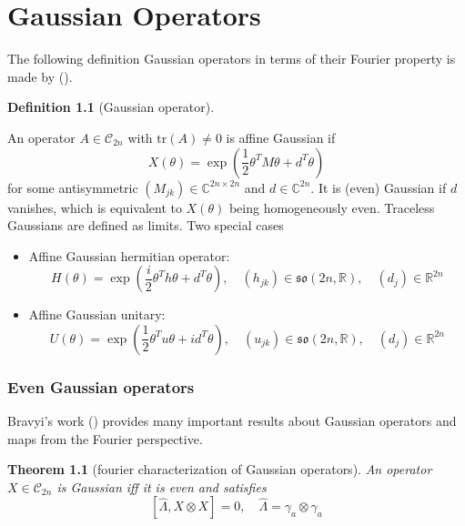 \documentclass[
]{book}
\providecommand{\tightlist}{%
  \setlength{\itemsep}{0pt}\setlength{\parskip}{0pt}}
\newtheorem{theorem}{Theorem}[chapter]
\theoremstyle{definition}
\newtheorem{definition}{Definition}[chapter]
\theoremstyle{definition}
\theoremstyle{definition}
\theoremstyle{definition}
\theoremstyle{remark}
\begin{document}
\chapter{Gaussian Operators}\label{gaussian-operators}

The following definition Gaussian operators in terms of their
Fourier property is made by ().

\begin{definition}[Gaussian operator]
\protect\hypertarget{def:gaussianDef}{}\label{def:gaussianDef}

An operator \(A\in \mathcal C_{2n}\) with \(\mathrm{tr}(A)\neq 0\) is affine Gaussian if
\[ 
    X(\theta) = \exp\left(\dfrac 1 2 \theta^T M\theta + d^T\theta\right)
\]
for some antisymmetric \((M_{jk})\in \mathbb C^{2n\times 2n}\) and
\(d\in \mathbb C^{2n}\). It is (even) Gaussian if \(d\) vanishes, which is
equivalent to \(X(\theta)\) being homogeneously even.
Traceless Gaussians are defined as limits.
Two special cases

\begin{itemize}
\tightlist
\item
  Affine Gaussian hermitian operator:
  \[ 
    H(\theta) = \exp\left(\dfrac i 2 \theta^T h\theta + d^T\theta\right), 
    \quad (h_{jk})\in \mathfrak{so}(2n, \mathbb R), \quad (d_j)\in \mathbb R^{2n}
  \]
\item
  Affine Gaussian unitary:
  \[ 
    U(\theta) = \exp\left(\dfrac 1 2 \theta^T u\theta + id^T\theta\right), 
    \quad (u_{jk})\in \mathfrak{so}(2n, \mathbb R), \quad (d_j)\in \mathbb R^{2n}
  \]
\end{itemize}

\end{definition}

\subsection{Even Gaussian operators}\label{even-gaussian-operators}

Bravyi's work () provides many important
results about Gaussian operators and maps from the Fourier perspective.

\begin{theorem}[fourier characterization of Gaussian operators]
\protect\hypertarget{thm:fourierEvenGaussianCharacterization}{}\label{thm:fourierEvenGaussianCharacterization}An operator \(X\in \mathcal C_{2n}\) is Gaussian iff it is even and satisfies
\[ 
    [\hat \Lambda, X\otimes X]=0, \quad \hat \Lambda = \gamma_a\otimes \gamma_a
\]
\end{theorem}
\end{document}
